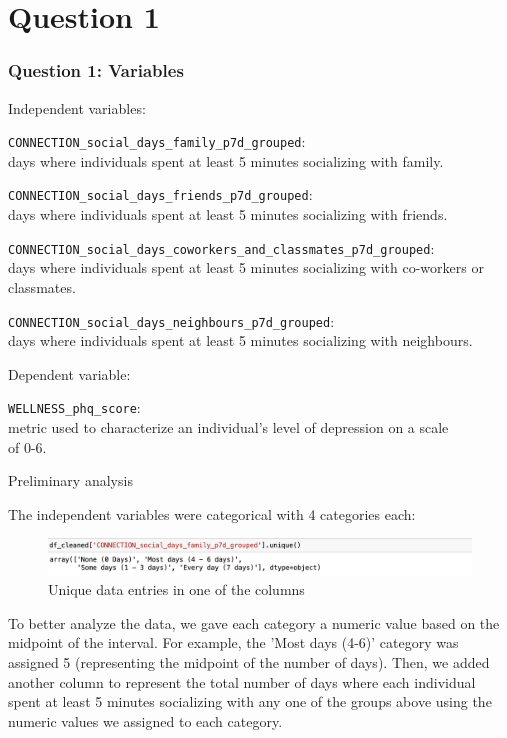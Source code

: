 \documentclass{beamer}
\begin{document}
\section{Question 1}
\begin{frame}
\frametitle{Question 1: Variables}

Independent variables:

\vspace{1em}

{\small{\tt CONNECTION\_social\_days\_family\_p7d\_grouped}:\\
days where individuals spent at least 5 minutes socializing with family.}

\vspace{0.5em}

{\small{\tt CONNECTION\_social\_days\_friends\_p7d\_grouped}:\\
days where individuals spent at least 5 minutes socializing with friends.}

\vspace{0.5em}

{\small{\tt CONNECTION\_social\_days\_coworkers\_and\_classmates\_p7d\_grouped}:\\
days where individuals spent at least 5 minutes socializing with co-workers or classmates.}

\vspace{0.5em}

{\small{\tt CONNECTION\_social\_days\_neighbours\_p7d\_grouped}:\\
days where individuals spent at least 5 minutes socializing with neighbours.}

\vspace{1.5em}

Dependent variable:

{\small{\tt WELLNESS\_phq\_score}:\\
metric used to characterize an individual's level of depression on a scale\\
of 0-6.}


\end{frame}


\begin{frame}{Preliminary analysis}

    The independent variables were categorical with 4 categories each: 
\begin{figure}
    \centering
    \includegraphics[width=1\linewidth]{image2.png}
    \caption{Unique data entries in one of the columns }
    \end{figure}
    To better analyze the data, we gave each category a numeric value based on the midpoint of the interval. For example, the 'Most days (4-6)' category was assigned 5 (representing the midpoint of the number of days). Then, we added another column to represent the total number of days where each individual spent at least 5 minutes socializing with any one of the groups above using the numeric values we assigned to each category. 
\end{frame}
\end{document}
